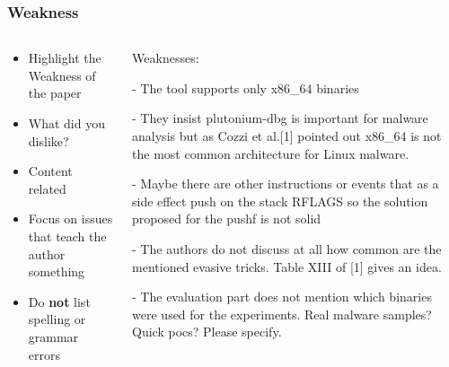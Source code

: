 \documentclass[xcolor={usenames,dvipsnames}]{beamer}
\begin{document}
\begin{frame}
	\frametitle{Weakness}

	\begin{columns}
		\begin{column}{0.5\linewidth}
			\begin{itemize}
				\item Highlight the Weakness of the paper
				\item What did you dislike?
				\item Content related
				\item \alert{Focus on issues that teach the author something}
				\item Do \textbf{not} list spelling or grammar errors
			\end{itemize}
		\end{column}
		\begin{column}{0.49\linewidth}
			\tiny
			Weaknesses:

			- The tool supports only x86\_64 binaries

			- They insist plutonium-dbg is important for malware analysis but as
			Cozzi et al.[1] pointed out x86\_64 is not the most common architecture
			for Linux malware.

			- Maybe there are other instructions or events that as a side effect
			push on the stack RFLAGS so the solution proposed for the pushf is not solid

			- The authors do not discuss at all how common are the mentioned evasive
			tricks. Table XIII of [1] gives an idea.

			- The evaluation part does not mention which binaries were used for the
			experiments. Real malware samples? Quick pocs? Please specify.
		\end{column}
	\end{columns}
\end{frame}
\end{document}
